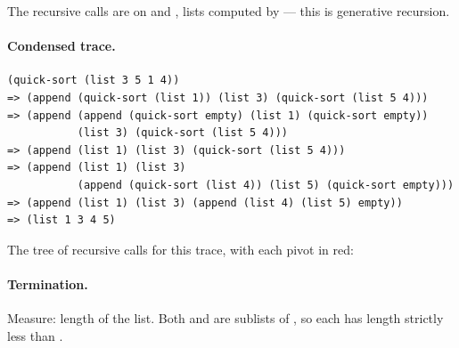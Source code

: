 The recursive calls are on  and , lists computed by
 --- this is generative recursion.

\paragraph{Condensed trace.}
\begin{lstlisting}[style=racket]
(quick-sort (list 3 5 1 4))
=> (append (quick-sort (list 1)) (list 3) (quick-sort (list 5 4)))
=> (append (append (quick-sort empty) (list 1) (quick-sort empty))
           (list 3) (quick-sort (list 5 4)))
=> (append (list 1) (list 3) (quick-sort (list 5 4)))
=> (append (list 1) (list 3)
           (append (quick-sort (list 4)) (list 5) (quick-sort empty)))
=> (append (list 1) (list 3) (append (list 4) (list 5) empty))
=> (list 1 3 4 5)
\end{lstlisting}

The tree of recursive calls for this trace, with each pivot in red:

\begin{center}
\end{center}

\paragraph{Termination.} Measure: length of the list. Both  and
 are sublists of , so each has length strictly
less than .

